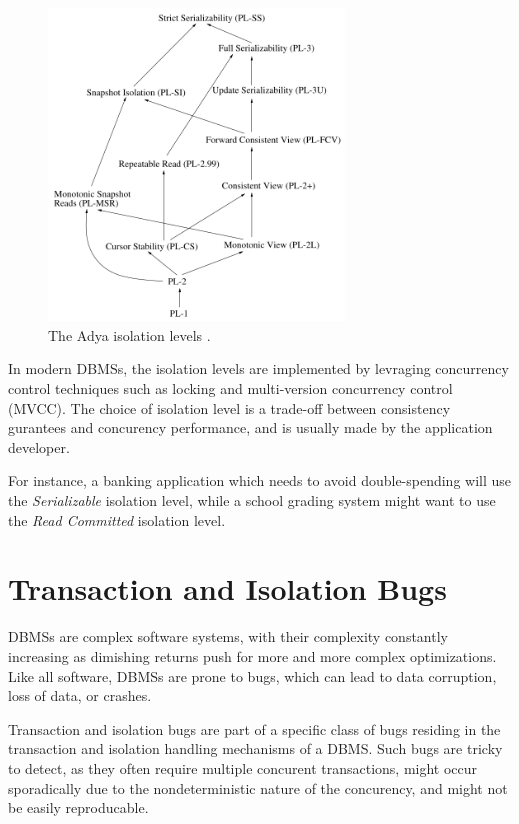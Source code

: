 \begin{figure}[H]
    \centering
    \includegraphics[width=0.7\textwidth]{assets/adya_isolation_levels.png}
    \caption{The Adya isolation levels \cite{adya1999weak}.}
    \label{fig:adya_isolation_levels}
\end{figure}

In modern DBMSs, the isolation levels are implemented by levraging concurrency control techniques such as locking and multi-version concurrency control (MVCC). The choice of isolation level is a trade-off between consistency gurantees and concurency performance, and is usually made by the application developer.

For instance, a banking application which needs to avoid double-spending will use the \textit{Serializable} isolation level, while a school grading system might want to use the \textit{Read Committed} isolation level.

\section{Transaction and Isolation Bugs}

DBMSs are complex software systems, with their complexity constantly increasing as dimishing returns push for more and more complex optimizations. Like all software, DBMSs are prone to bugs, which can lead to data corruption, loss of data, or crashes.

Transaction and isolation bugs are part of a specific class of bugs residing in the transaction and isolation handling mechanisms of a DBMS. Such bugs are tricky to detect, as they often require multiple concurent transactions, might occur sporadically due to the nondeterministic nature of the concurency, and might not be easily reproducable.

